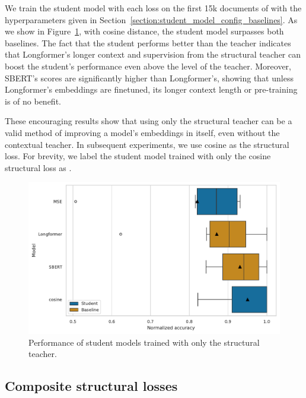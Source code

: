 We train the student model with each loss on the first 15k documents of
 with the hyperparameters given in
Section~\ref{section:student_model_config_baselines}. As we show in
Figure~\ref{fig:structural_basic}, with cosine distance, the student model
surpasses both baselines. The fact that the student performs better
than the teacher indicates that Longformer's longer context and supervision from
the structural teacher can boost the student's performance even above the level
of the teacher. Moreover, SBERT's scores are significantly higher than
Longformer's, showing that unless Longformer's embeddings are finetuned, its
longer context length or pre-training is of no benefit.

These encouraging results show that using only the structural teacher can be a
valid method of improving a model's embeddings in itself, even without the
contextual teacher. In subsequent experiments, we use cosine as the structural
loss. For brevity, we label the student model trained with only the cosine
structural loss as .

\begin{figure}
  \includegraphics[width=\textwidth]{img/structural_simple_losses.pdf}

  \caption{Performance of student models trained with only the structural
  teacher.}

  \label{fig:structural_basic}
\end{figure}

\subsection{Composite structural losses}\label{section:composite_losses}


